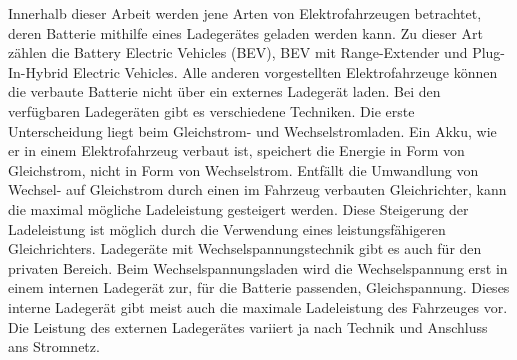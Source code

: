 Innerhalb dieser Arbeit werden jene Arten von Elektrofahrzeugen betrachtet, deren Batterie mithilfe eines Ladegerätes geladen werden kann. Zu dieser Art zählen die Battery Electric Vehicles (BEV), BEV mit Range-Extender und Plug-In-Hybrid Electric Vehicles. Alle anderen vorgestellten Elektrofahrzeuge können die verbaute Batterie nicht über ein externes Ladegerät laden. Bei den verfügbaren Ladegeräten gibt es verschiedene Techniken. Die erste Unterscheidung liegt beim Gleichstrom- und Wechselstromladen. Ein Akku, wie er in einem Elektrofahrzeug verbaut ist, speichert die Energie in Form von Gleichstrom, nicht in Form von Wechselstrom. Entfällt die Umwandlung von Wechsel- auf Gleichstrom durch einen im Fahrzeug verbauten Gleichrichter, kann die maximal mögliche Ladeleistung gesteigert werden. Diese Steigerung der Ladeleistung ist möglich durch die Verwendung eines leistungsfähigeren Gleichrichters. Ladegeräte mit Wechselspannungstechnik gibt es auch für den privaten Bereich. Beim Wechselspannungsladen wird die Wechselspannung erst in einem internen Ladegerät zur, für die Batterie passenden, Gleichspannung. Dieses interne Ladegerät gibt meist auch die maximale Ladeleistung des Fahrzeuges vor. Die Leistung des externen Ladegerätes variiert ja nach Technik und Anschluss ans Stromnetz. \\
